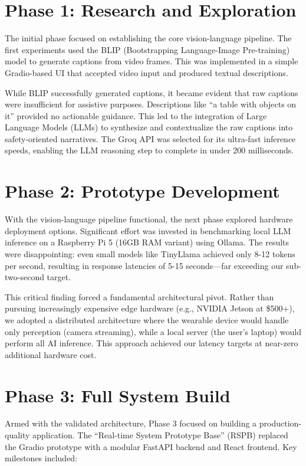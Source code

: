 \documentclass[12pt,a4paper]{report}
\begin{document}
\section{Phase 1: Research and Exploration}

The initial phase focused on establishing the core vision-language pipeline. The first experiments used the BLIP (Bootstrapping Language-Image Pre-training) model to generate captions from video frames. This was implemented in a simple Gradio-based UI that accepted video input and produced textual descriptions.

While BLIP successfully generated captions, it became evident that raw captions were insufficient for assistive purposes. Descriptions like ``a table with objects on it'' provided no actionable guidance. This led to the integration of Large Language Models (LLMs) to synthesize and contextualize the raw captions into safety-oriented narratives. The Groq API was selected for its ultra-fast inference speeds, enabling the LLM reasoning step to complete in under 200 milliseconds.

\section{Phase 2: Prototype Development}

With the vision-language pipeline functional, the next phase explored hardware deployment options. Significant effort was invested in benchmarking local LLM inference on a Raspberry Pi 5 (16GB RAM variant) using Ollama. The results were disappointing: even small models like TinyLlama achieved only 8-12 tokens per second, resulting in response latencies of 5-15 seconds—far exceeding our sub-two-second target.

This critical finding forced a fundamental architectural pivot. Rather than pursuing increasingly expensive edge hardware (e.g., NVIDIA Jetson at \$500+), we adopted a distributed architecture where the wearable device would handle only perception (camera streaming), while a local server (the user's laptop) would perform all AI inference. This approach achieved our latency targets at near-zero additional hardware cost.

\section{Phase 3: Full System Build}

Armed with the validated architecture, Phase 3 focused on building a production-quality application. The ``Real-time System Prototype Base'' (RSPB) replaced the Gradio prototype with a modular FastAPI backend and React frontend. Key milestones included:
\end{document}
